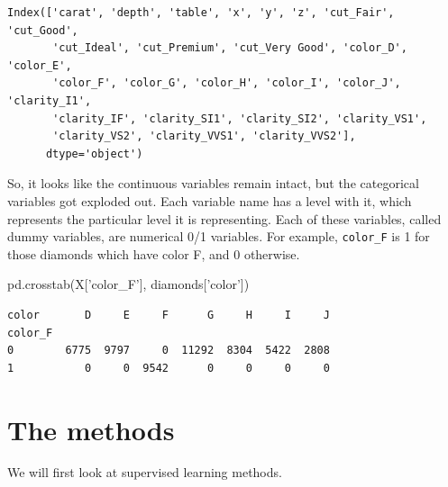 \documentclass[
  letterpaper,
]{scrbook}
\newenvironment{Shaded}{\begin{snugshade}}{\end{snugshade}}
\newcommand{\NormalTok}[1]{#1}
\newcommand{\StringTok}[1]{\textcolor[rgb]{0.31,0.60,0.02}{#1}}
\begin{document}
\begin{verbatim}
Index(['carat', 'depth', 'table', 'x', 'y', 'z', 'cut_Fair', 'cut_Good',
       'cut_Ideal', 'cut_Premium', 'cut_Very Good', 'color_D', 'color_E',
       'color_F', 'color_G', 'color_H', 'color_I', 'color_J', 'clarity_I1',
       'clarity_IF', 'clarity_SI1', 'clarity_SI2', 'clarity_VS1',
       'clarity_VS2', 'clarity_VVS1', 'clarity_VVS2'],
      dtype='object')
\end{verbatim}

So, it looks like the continuous variables remain intact, but the categorical variables got exploded out. Each
variable name has a level with it, which represents the particular level it is representing. Each of these
variables, called dummy variables, are numerical 0/1 variables. For example, \texttt{color\_F} is 1 for those diamonds which have color F, and 0 otherwise.

\begin{Shaded}
\begin{Highlighting}[]
\NormalTok{pd.crosstab(X[}\StringTok{'color_F'}\NormalTok{], diamonds[}\StringTok{'color'}\NormalTok{])}
\end{Highlighting}
\end{Shaded}

\begin{verbatim}
color       D     E     F      G     H     I     J
color_F                                           
0        6775  9797     0  11292  8304  5422  2808
1           0     0  9542      0     0     0     0
\end{verbatim}

\hypertarget{the-methods}{%
\section{The methods}\label{the-methods}}

We will first look at supervised learning methods.
\end{document}
